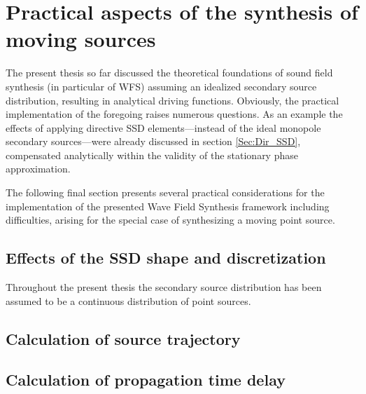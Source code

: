 \section{Practical aspects of the synthesis of moving sources}

The present thesis so far discussed the theoretical foundations of sound field synthesis (in particular of WFS) assuming an idealized secondary source distribution, resulting in analytical driving functions.
Obviously, the practical implementation of the foregoing raises numerous questions.
As an example the effects of applying directive SSD elements---instead of the ideal monopole secondary sources---were already discussed in section \ref{Sec:Dir_SSD}, compensated analytically within the validity of the stationary phase approximation.

The following final section presents several practical considerations for the implementation of the presented Wave Field Synthesis framework including difficulties, arising for the special case of synthesizing a moving point source.

\subsection{Effects of the SSD shape and discretization}

Throughout the present thesis the secondary source distribution has been assumed to be a continuous distribution of point sources.



\subsection{Calculation of source trajectory}

\subsection{Calculation of propagation time delay}